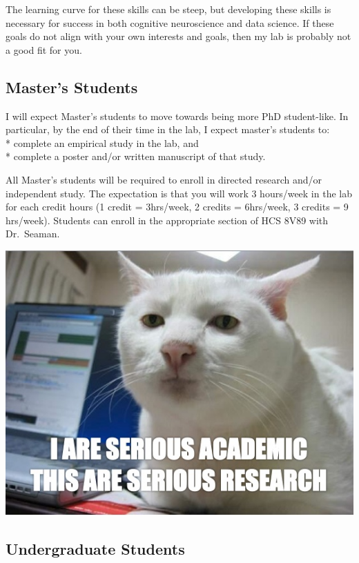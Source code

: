 \documentclass[]{book}
\begin{document}
The learning curve for these skills can be steep, but developing these skills is necessary for success in both cognitive neuroscience and data science. If these goals do not align with your own interests and goals, then my lab is probably not a good fit for you.

\hypertarget{masters-students}{%
\subsection{Master's Students}\label{masters-students}}

I will expect Master's students to move towards being more PhD student-like. In particular, by the end of their time in the lab, I expect master's students to:\\
* complete an empirical study in the lab, and\\
* complete a poster and/or written manuscript of that study.

All Master's students will be required to enroll in directed research and/or independent study. The expectation is that you will work 3 hours/week in the lab for each credit hours (1 credit = 3hrs/week, 2 credits = 6hrs/week, 3 credits = 9 hrs/week). Students can enroll in the appropriate section of HCS 8V89 with Dr.~Seaman.

\includegraphics{images/researchcat.jpg}

\hypertarget{undergraduate-students}{%
\subsection{Undergraduate Students}\label{undergraduate-students}}
\end{document}
